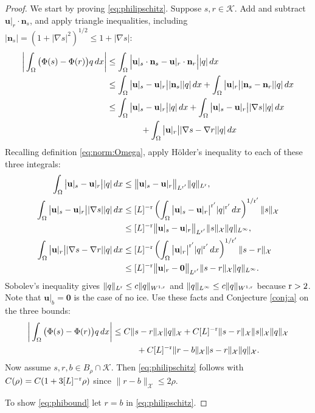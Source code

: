 \documentclass[hidelinks,onefignum,onetabnum,final]{siamart220329}  %
\newcommand{\grad}{\nabla}
\newcommand{\bn}{\mathbf{n}}
\newcommand{\bu}{\mathbf{u}}
\newcommand{\bzero}{\bm{0}}
\newcommand{\cK}{\mathcal{K}}
\newcommand{\cX}{\mathcal{X}}
\newcommand{\rr}{{\text{\textnormal{r}}}}
\begin{document}
\begin{proof}
We start by proving \eqref{eq:philipschitz}.  Suppose $s,r\in\cK$.  Add and subtract $\bu|_r \cdot \bn_s$, and apply triangle inequalities, including $|\bn_s|=\left(1+|\grad s|^2\right)^{1/2} \le 1 + |\grad s|$:
\begin{align}
\bigg|\int_\Omega \big(\Phi(s) - \Phi(r)\big) q\,dx\bigg| &\le \int_\Omega \Big|\bu|_s\cdot \bn_s - \bu|_r \cdot \bn_r\Big| |q|\,dx \\
    &\le \int_\Omega \big|\bu|_s - \bu|_r\big| |\bn_s| |q|\,dx + \int_\Omega \big|\bu|_r\big| |\bn_s-\bn_r| |q|\,dx \notag \\
    &\le \int_\Omega \big|\bu|_s - \bu|_r\big| |q|\,dx + \int_\Omega \big|\bu|_s - \bu|_r\big| |\grad s| |q|\,dx \notag \\
    &\qquad\qquad + \int_\Omega \big|\bu|_r\big| |\grad s-\grad r| |q|\,dx \notag
\end{align}
Recalling definition \eqref{eq:norm:Omega}, apply H\"older's inequality to each of these three integrals:
\begin{align}
\int_\Omega \big|\bu|_s - \bu|_r\big| |q|\,dx &\le \big\|\bu|_s - \bu|_r\big\|_{L^{\rr'}} \|q\|_{L^{\rr}}, \\
\int_\Omega \big|\bu|_s - \bu|_r\big| |\grad s| |q|\,dx &\le [L]^{-\rr} \left(\int_\Omega \big|\bu|_s - \bu|_r\big|^{\rr'} |q|^{\rr'}\, dx\right)^{1/\rr'} \|s\|_{\cX} \\
    &\le [L]^{-\rr} \big\|\bu|_s - \bu|_r\big\|_{L^{\rr'}} \|s\|_{\cX} \|q\|_{L^\infty}, \notag \\
\int_\Omega \big|\bu|_r\big| |\grad s-\grad r| |q|\,dx &\le [L]^{-\rr} \left(\int_\Omega \big|\bu|_r\big|^{\rr'} |q|^{\rr'}\, dx\right)^{1/\rr'} \|s-r\|_{\cX} \\
    &\le [L]^{-\rr} \big\|\bu|_r - \bzero\big\|_{L^{\rr'}} \|s-r\|_{\cX} \|q\|_{L^\infty}. \notag
\end{align}
Sobolev's inequality gives $\|q\|_{L^{\rr}} \le c \|q\|_{W^{1,\rr}}$ and $\|q\|_{L^\infty} \le c \|q\|_{W^{1,\rr}}$ because $\rr>2$.  Note that $\bu|_b=\bzero$ is the case of no ice.  Use these facts and Conjecture \ref{conj:a} on the three bounds:
\begin{align}
\bigg|\int_\Omega \big(\Phi(s) - \Phi(r)\big) q\,dx\bigg| &\le C \|s-r\|_{\cX} \|q\|_{\cX} + C [L]^{-\rr} \|s-r\|_{\cX} \|s\|_{\cX} \|q\|_{\cX} \\
    &\hspace{10mm} + C [L]^{-\rr} \|r - b\|_{\cX} \|s-r\|_{\cX} \|q\|_{\cX}. \notag
\end{align}
Now assume $s,r,b\in B_\rho\cap \cK$.  Then \eqref{eq:philipschitz} follows with $C(\rho) = C (1 + 3 [L]^{-\rr} \rho)$ since $\|r - b\|_{\cX}\le 2\rho$.

To show \eqref{eq:phibound} let $r=b$ in \eqref{eq:philipschitz}.
\end{proof}
\end{document}
